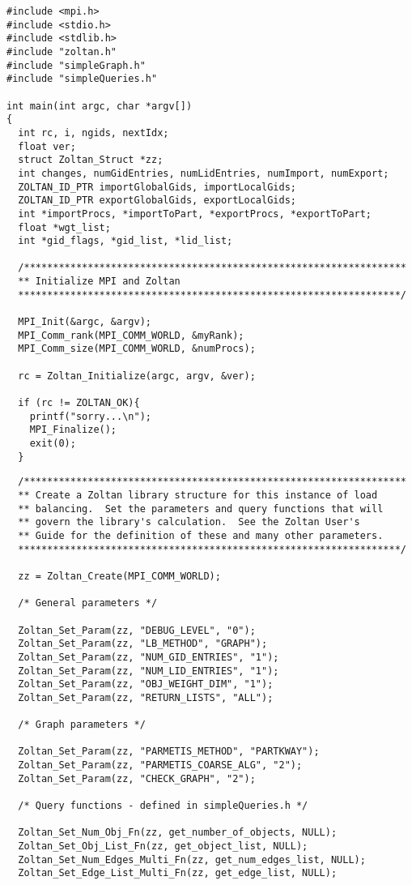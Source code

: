 \begin{flushleft}
\begin{verbatim}
#include <mpi.h>
#include <stdio.h>
#include <stdlib.h>
#include "zoltan.h"
#include "simpleGraph.h"
#include "simpleQueries.h"

int main(int argc, char *argv[])
{
  int rc, i, ngids, nextIdx;
  float ver;
  struct Zoltan_Struct *zz;
  int changes, numGidEntries, numLidEntries, numImport, numExport;
  ZOLTAN_ID_PTR importGlobalGids, importLocalGids;
  ZOLTAN_ID_PTR exportGlobalGids, exportLocalGids;
  int *importProcs, *importToPart, *exportProcs, *exportToPart;
  float *wgt_list;
  int *gid_flags, *gid_list, *lid_list;

  /******************************************************************
  ** Initialize MPI and Zoltan
  ******************************************************************/

  MPI_Init(&argc, &argv);
  MPI_Comm_rank(MPI_COMM_WORLD, &myRank);
  MPI_Comm_size(MPI_COMM_WORLD, &numProcs);

  rc = Zoltan_Initialize(argc, argv, &ver);

  if (rc != ZOLTAN_OK){
    printf("sorry...\n");
    MPI_Finalize();
    exit(0);
  }
\end{verbatim}
\end{flushleft}

\clearpage
\begin{flushleft}
\begin{verbatim}
  /******************************************************************
  ** Create a Zoltan library structure for this instance of load
  ** balancing.  Set the parameters and query functions that will
  ** govern the library's calculation.  See the Zoltan User's
  ** Guide for the definition of these and many other parameters.
  ******************************************************************/

  zz = Zoltan_Create(MPI_COMM_WORLD);

  /* General parameters */

  Zoltan_Set_Param(zz, "DEBUG_LEVEL", "0");
  Zoltan_Set_Param(zz, "LB_METHOD", "GRAPH");
  Zoltan_Set_Param(zz, "NUM_GID_ENTRIES", "1"); 
  Zoltan_Set_Param(zz, "NUM_LID_ENTRIES", "1");
  Zoltan_Set_Param(zz, "OBJ_WEIGHT_DIM", "1");
  Zoltan_Set_Param(zz, "RETURN_LISTS", "ALL");

  /* Graph parameters */

  Zoltan_Set_Param(zz, "PARMETIS_METHOD", "PARTKWAY"); 
  Zoltan_Set_Param(zz, "PARMETIS_COARSE_ALG", "2");
  Zoltan_Set_Param(zz, "CHECK_GRAPH", "2"); 

  /* Query functions - defined in simpleQueries.h */

  Zoltan_Set_Num_Obj_Fn(zz, get_number_of_objects, NULL);
  Zoltan_Set_Obj_List_Fn(zz, get_object_list, NULL);
  Zoltan_Set_Num_Edges_Multi_Fn(zz, get_num_edges_list, NULL);
  Zoltan_Set_Edge_List_Multi_Fn(zz, get_edge_list, NULL);
\end{verbatim}
\end{flushleft}

